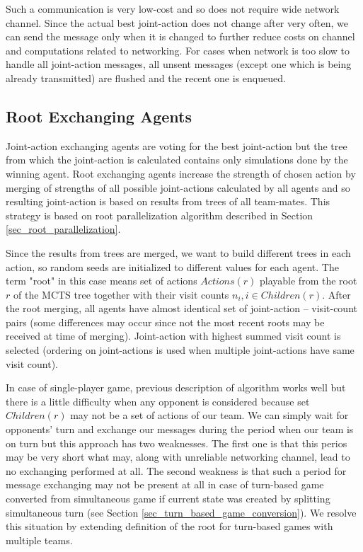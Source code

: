 Such a communication is very low-cost and so does not require wide network channel. Since the
actual best joint-action does not change after very often, we can send the message only when it
is changed to further reduce costs on channel and computations related to networking. For cases
when network is too slow to handle all joint-action messages, all unsent messages (except one
which is being already transmitted) are flushed and the recent one is enqueued.


\subsection{Root Exchanging Agents}
\label{sec_root_exchanging_agents}

Joint-action exchanging agents are voting for the best joint-action but the tree from which the
joint-action is calculated contains only simulations done by the winning agent. Root exchanging
agents increase the strength of chosen action by merging of strengths of all possible 
joint-actions calculated by
all agents and so resulting joint-action is based on results from trees of all team-mates. This
strategy is based on root parallelization algorithm described in Section
\ref{sec_root_parallelization}.

Since the results from trees are merged, we want to build different trees in each action, so 
random seeds
are initialized to different values for each agent. The term "root" in this case means set of
actions $Actions(r)$ playable from the root $r$ of the MCTS tree together with their visit
counts $n_i, i \in Children(r)$. After the root merging, all agents have almost identical
set of joint-action -- visit-count pairs (some differences may occur since not the most recent roots
may be received at time of merging). Joint-action with highest summed visit count is
selected (ordering on joint-actions is used when multiple joint-actions have same visit count).

In case of single-player game, previous description of algorithm works well but there is a little
difficulty when any opponent is considered because set $Children(r)$ may not be a set of actions of
our team. We can simply wait for opponents' turn and exchange our messages during the period
when our team is on turn but this approach has two weaknesses. The first one is that this
perios may be very short what may, along with unreliable networking channel, lead to no
exchanging performed at all. The second weakness is that such a period for message
exchanging may not be present at all in case of turn-based game converted from simultaneous
game if current state was created by splitting simultaneous turn (see Section 
\ref{sec_turn_based_game_conversion}). We resolve this situation by extending definition of the
root for turn-based games with multiple teams. 

